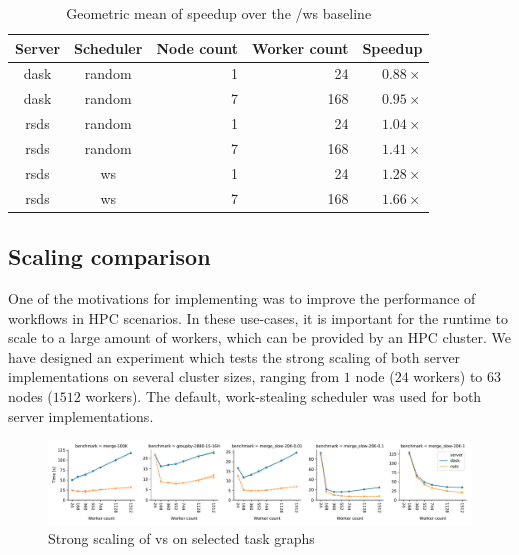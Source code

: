\setlength{\tabcolsep}{5pt}
\begin{table}
	\caption[caption]{Geometric mean of speedup over the \dask{}/ws baseline}
	\centering
	\label{tab:rsds-geom-mean-speedup}
	\begin{tabular}{c|c|r|r|r}
		\textbf{Server} & \textbf{Scheduler} & \textbf{Node count} & \textbf{Worker	count} &
		\textbf{Speedup}                                                                                 \\
		\midrule
		dask            & random             & 1                   & 24                   & $0.88\times$ \\
		dask            & random             & 7                   & 168                  & $0.95\times$ \\
		rsds            & random             & 1                   & 24                   & $1.04\times$ \\
		rsds            & random             & 7                   & 168                  & $1.41\times$ \\
		rsds            & ws                 & 1                   & 24                   & $1.28\times$ \\
		rsds            & ws                 & 7                   & 168                  & $1.66\times$ \\
	\end{tabular}
\end{table}

\subsection*{Scaling comparison}
One of the motivations for implementing \rsds{} was to improve the performance
of \dask{} workflows in HPC scenarios. In these use-cases, it is important for
the runtime to scale to a large amount of workers, which can be provided by an HPC cluster. We have
designed an experiment which tests the strong scaling of both server implementations on several
cluster sizes, ranging from $1$ node ($24$ workers) to
$63$ nodes ($1512$ workers). The default, work-stealing
scheduler was used for both server implementations.

\begin{figure}[h]
	\centering
	\includegraphics[width=\textwidth]{./imgs/rsds/charts/rsds-dask-scaling}
	\caption{Strong scaling of \rsds{} vs \dask{} on selected task graphs}
	\label{fig:rsds-dask-scaling}
\end{figure}

